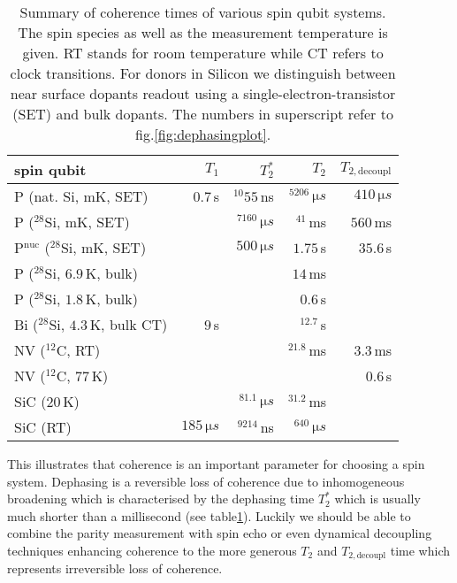 \bgroup
\def\arraystretch{1.3}%
\begin{table}[H] 
	\footnotesize 
	\begin{tabular}{lrrrr}
		\hline
		spin qubit & $T_1$ & $T_2^{*}$ & $T_2$ & $T_{2,\textrm{decoupl}}$ \\ \hline 
		P (nat. Si, mK, SET) \cite{Pla2012}& $0.7\, $s & $^{10}55\, $ns  & $^5206\, \si{\micro s}$ & $410\, \si{\micro s}$  \\
		P ($^{28}$Si, mK, SET) \cite{Muhonen2014}&  & $^7160\, \si{\micro s}$  & $^41\, $ms & $560\, $ms \\
		P$^{\text{nuc}}$ ($^{28}$Si, mK, SET) \cite{Muhonen2014}& & $500\, \si{\micro s}$ & $1.75\, $s & $35.6\, $s \\
		P ($^{28}$Si, $6.9\, $K, bulk) \cite{Morley2010}& &  & $14\, $ms &  \\
		P ($^{28}$Si, $1.8\, $K, bulk) \cite{Tyryshkin2011}& &  & $0.6\, $s &  \\
		Bi ($^{28}$Si, $4.3\, $K, bulk CT) \cite{Wolfowicz2013} & $9\, $s &  & $^12.7\, $s &\\
		NV ($^{12}$C, RT) \cite{Balasubramanian2009,Bar-Gill2013} & & & $^21.8\, $ms & $3.3\, $ms \\
		NV ($^{12}$C, $77\, $K) \cite{Bar-Gill2013} & & &  & $0.6\, $s \\
		SiC ($20\, $K) \cite{Christle2014} & & $^81.1\, \si{\micro s}$ & $^31.2\, $ms &  \\
		SiC (RT) \cite{Koehl2011} & $185\, \si{\micro s}$ & $^9214\, $ns & $^640\, \si{\micro s}$ &   \\
		\hline
	\end{tabular} 
	\caption{Summary of coherence times of various spin qubit systems. The spin species as well as the measurement temperature is given. RT stands for room temperature while CT refers to clock transitions. For donors in Silicon we distinguish between near surface dopants readout using a single-electron-transistor (SET) and bulk dopants. The numbers in superscript refer to fig.\@ \ref{fig:dephasingplot}.}
	\label{TAB:qubits}
\end{table}
\egroup




This illustrates that coherence is an important parameter for choosing a spin system. Dephasing is a reversible loss of coherence due to inhomogeneous broadening which is characterised by the dephasing time $T_2^*$ which is usually much shorter than a millisecond (see table\@ \ref{TAB:qubits}). Luckily we should be able to combine the parity measurement with spin echo or even dynamical decoupling techniques enhancing coherence to the more generous $T_2$ and $T_{2,\textrm{decoupl}}$ time which represents irreversible loss of coherence.

